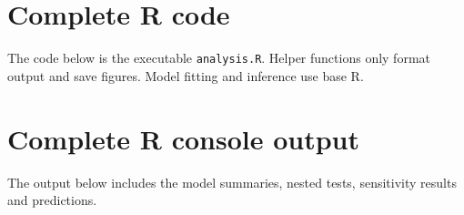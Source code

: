 \documentclass[11pt,a4paper]{article}
\begin{document}
\bigskip
\appendix
\section{Complete R code}\label{app:code}
The code below is the executable \texttt{analysis.R}. Helper functions only format
output and save figures. Model fitting and inference use base R.


\section{Complete R console output}\label{app:output}
The output below includes the model summaries, nested tests, sensitivity
results and predictions.

\end{document}
